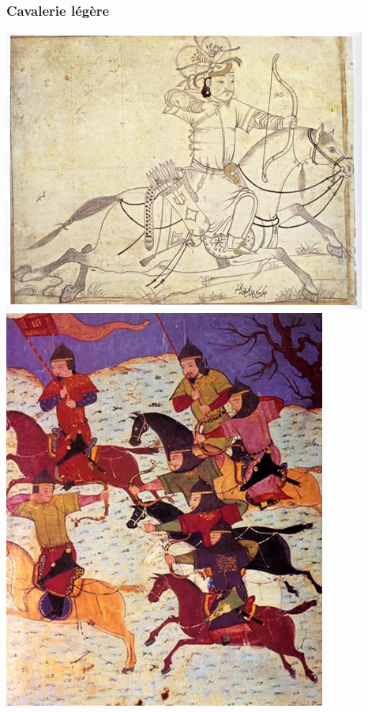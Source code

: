 \documentclass{article}
\begin{document}
\subsubsection{Cavalerie légère}
\includegraphics[width=0.5\paperwidth]{../ressources/IlkhanidHorseArcher}
\includegraphics[width=0.47\paperwidth]{../ressources/MongolCavalrymen}
\cite{archery,mongol_army}
\end{document}
